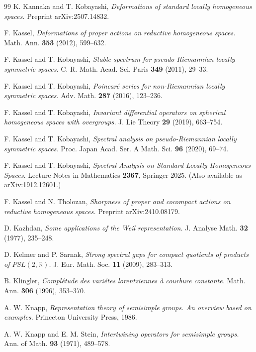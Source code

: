 \documentclass[10]{amsart}
\theoremstyle{remark}
\theoremstyle{definition}
\numberwithin{equation}{section}
\newcommand{\R}{\mathbb{R}}           %
\begin{document}
{\begin{thebibliography}{99}
 K. Kannaka and T. Kobayashi, {\em Deformations of standard locally homogeneous spaces.} Preprint arXiv:2507.14832.

 F. Kassel, {\em Deformations of proper actions on reductive homogeneous spaces.} Math. Ann. {\bf 353} (2012), 
599--632.

 F. Kassel and T. Kobayashi, {\em Stable spectrum for pseudo-Riemannian locally symmetric spaces.} C. R. Math. Acad. Sci. Paris {\bf 349} (2011), 29--33.

 F. Kassel and T. Kobayashi, {\em Poincar\' e series for non-Riemannian locally symmetric spaces.} Adv. Math. {\bf 287} (2016), 
123--236.

 F. Kassel and T. Kobayashi, {\em Invariant differential operators on spherical homogeneous spaces with overgroups.} J. Lie Theory {\bf 29} (2019), 663--754.

 F. Kassel and T. Kobayashi, {\em Spectral analysis on pseudo-Riemannian locally symmetric spaces.} Proc. Japan Acad. Ser. A Math. Sci. {\bf 96} (2020), 69--74.

 F. Kassel and T. Kobayashi, {\em Spectral Analysis on Standard Locally Homogeneous Spaces.} Lecture Notes in Mathematics {\bf 2367}, Springer 2025. (Also available as arXiv:1912.12601.)

 F. Kassel and N. Tholozan, {\em Sharpness of proper and cocompact actions on reductive homogeneous spaces.} Preprint arXiv:2410.08179.

%
 D. Kazhdan, {\it Some applications of the Weil representation.}  J. Analyse Math. {\bf 32} (1977), 235--248.

 D. Kelmer and P. Sarnak, {\it Strong spectral gaps for compact quotients of products of $PSL(2,\R)$.}  J. Eur. Math. Soc. {\bf 11} (2009), 283--313.

 B. Klingler, {\em Compl\' etude des vari\' etes lorentziennes \` a courbure constante.} Math. Ann. {\bf 306} (1996), 353--370.

 A. W. Knapp,  {\em Representation theory of semisimple groups. An overview based on examples.} Princeton University Press, 1986.

 A. W. Knapp and E. M. Stein, {\it Intertwining operators for semisimple groups.} Ann. of Math. {\bf 93} (1971), 489--578.


\end{thebibliography}}
\end{document}
